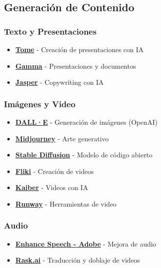 \documentclass[
  jou,
  floatsintext,
  longtable,
  a4paper,
  nolmodern,
  notxfonts,
  notimes,
  12pt,
  colorlinks=true,linkcolor=blue,citecolor=blue,urlcolor=blue]{apa7}
\providecommand{\tightlist}{%
  \setlength{\itemsep}{0pt}\setlength{\parskip}{0pt}}
\begin{document}
\subsection{Generación de Contenido}\label{generaciuxf3n-de-contenido}

\subsubsection{Texto y Presentaciones}\label{texto-y-presentaciones}

\begin{itemize}
\tightlist
\item
  \textbf{\href{https://tome.app/}{Tome}} - Creación de presentaciones
  con IA
\item
  \textbf{\href{https://gamma.app/generate}{Gamma}} - Presentaciones y
  documentos
\item
  \textbf{\href{https://www.jasper.ai/}{Jasper}} - Copywriting con IA
\end{itemize}

\subsubsection{Imágenes y Video}\label{imuxe1genes-y-video}

\begin{itemize}
\tightlist
\item
  \textbf{\href{https://labs.openai.com/}{DALL·E}} - Generación de
  imágenes (OpenAI)
\item
  \textbf{\href{https://www.midjourney.com/}{Midjourney}} - Arte
  generativo
\item
  \textbf{\href{https://stability.ai/}{Stable Diffusion}} - Modelo de
  código abierto
\item
  \textbf{\href{https://app.fliki.ai/studio/drive}{Fliki}} - Creación de
  videos
\item
  \textbf{\href{https://kaiber.ai/}{Kaiber}} - Videos con IA
\item
  \textbf{\href{https://app.runwayml.com/video-tools/}{Runway}} -
  Herramientas de video
\end{itemize}

\subsubsection{Audio}\label{audio}

\begin{itemize}
\tightlist
\item
  \textbf{\href{https://podcast.adobe.com/enhance}{Enhance Speech -
  Adobe}} - Mejora de audio
\item
  \textbf{\href{https://www.rask.ai/}{Rask.ai}} - Traducción y doblaje
  de videos
\end{itemize}
\end{document}
